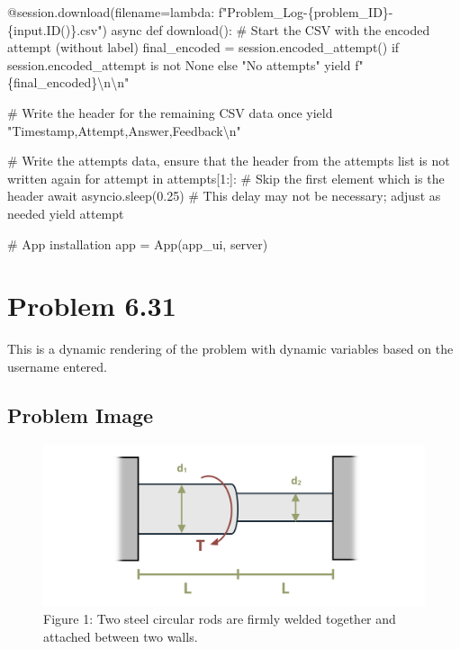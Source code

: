 \documentclass[
  letterpaper,
  DIV=11,
  numbers=noendperiod]{scrreprt}
\newenvironment{Shaded}{\begin{snugshade}}{\end{snugshade}}
\newcommand{\NormalTok}[1]{\textcolor[rgb]{0.00,0.23,0.31}{#1}}
\begin{document}
\begin{Shaded}
\begin{Highlighting}[]
\NormalTok{    @session.download(filename=lambda: f"Problem\_Log{-}\{problem\_ID\}{-}\{input.ID()\}.csv")}
\NormalTok{    async def download():}
\NormalTok{        \# Start the CSV with the encoded attempt (without label)}
\NormalTok{        final\_encoded = session.encoded\_attempt() if session.encoded\_attempt is not None else "No attempts"}
\NormalTok{        yield f"\{final\_encoded\}\textbackslash{}n\textbackslash{}n"}
        
\NormalTok{        \# Write the header for the remaining CSV data once}
\NormalTok{        yield "Timestamp,Attempt,Answer,Feedback\textbackslash{}n"}
        
\NormalTok{        \# Write the attempts data, ensure that the header from the attempts list is not written again}
\NormalTok{        for attempt in attempts[1:]:  \# Skip the first element which is the header}
\NormalTok{            await asyncio.sleep(0.25)  \# This delay may not be necessary; adjust as needed}
\NormalTok{            yield attempt}


\NormalTok{\# App installation}
\NormalTok{app = App(app\_ui, server)}
\end{Highlighting}
\end{Shaded}

\chapter*{Problem 6.31}\label{problem-6.31}


This is a dynamic rendering of the problem with dynamic variables based
on the username entered.

\section*{Problem Image}\label{problem-image-72}


\begin{figure}[H]

{\centering \includegraphics{images/293.png}

}

\caption{Figure 1: Two steel circular rods are firmly welded together
and attached between two walls.}

\end{figure}%
\end{document}
